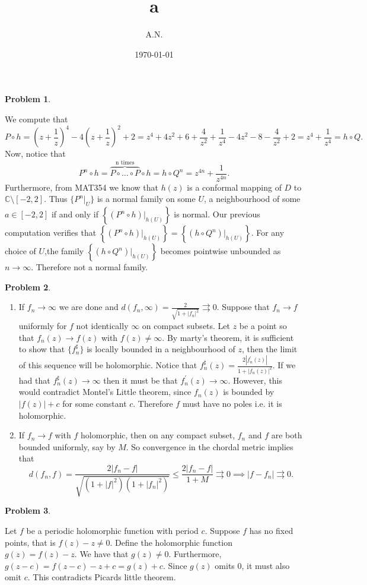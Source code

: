 \documentclass[12pt, a4paper]{article}
\title{a}
\author{A.N.}
\date{\today}
\newtheorem{problem}{Problem}
\theoremstyle{definition}
\newcommand{\penum}{ \begin{enumerate}[label=\bf(\alph*), leftmargin=0pt]}
\newcommand{\epenum}{ \end{enumerate} }
\newcommand{\C}{\mathbb{C}}                           %
\begin{document}
	\begin{problem}
	\end{problem}
We compute that $$P \circ h = \left(z+\frac{1}{z} \right)^4 - 4\left(z+\frac{1}{z}\right)^2 + 2 =z^4+4z^2+6+\frac{4}{z^2}+ \frac{1}{z^4}-4z^2-8 - \frac{4}{z^2}+2 = z^4+\frac{1}{z^4} = h\circ Q. $$ Now, notice that $$P^n \circ h = \overbrace{P \circ \dots \circ P}^{\text{n times}} \circ h = h \circ Q^n = z^{4n} + \frac{1}{z^{4n}}. $$
Furthermore, from MAT354 we know that $h(z)$ is a conformal mapping of $D$ to $\C \setminus{[-2,2]}$. Thus $\{P^n|_U\}$ is a normal family on some $U$, a neighbourhood of some $a\in [-2,2]$ if and only if $ \left\{(P^n\circ h)|_{h(U)} \right\}$ is normal. Our previous computation verifies that $\left\{(P^n\circ h)|_{h(U)} \right\} =  \left\{(h\circ Q^n)|_{h(U)} \right\}$. For any choice of $U$,the family  $ \left\{(h\circ Q^n)|_{h(U)} \right\}$ becomes pointwise unbounded as $n\to \infty$. Therefore not a normal family. 
\newpage
\begin{problem}
\end{problem}
\penum
\item If $f_n\to \infty$ we are done and $d(f_n,\infty) = \frac{2}{\sqrt{1+ |f_n|^2}} \rightrightarrows 0 $. Suppose that $f_n\to f$ uniformly for $f$ not identically $\infty$ on compact subsets. Let $z$ be a point so that $f_n(z)\to f(z)$ with $f(z)\neq \infty$. By marty's theorem, it is sufficient to show that $\{f_n^\sharp\}$ is locally bounded in a neighbourhood of $z$, then the limit of this sequence will be holomorphic. Notice that $f_n^\sharp(z) = \frac{2|f_n^\prime(z)|}{1+ |f_n(z)|^2}$. If we had that $f_n^\sharp(z)\to \infty$ then it must be that $f_n^\prime(z)\to \infty$. However, this would contradict Montel's Little theorem, since $f_n(z)$ is bounded by $|f(z)|+c$ for some constant $c$. Therefore $f$ must have no poles i.e. it is holomorphic. 
\item If $f_n \to f$ with $f$ holomorphic, then on any compact subset, $f_n$ and $f$ are both bounded uniformly, say by $M$. So convergence in the chordal metric implies that $$d(f_n,f) = \frac{2|f_n-f|}{\sqrt{(1+|f|^2)(1+|f_n|^2)} } \leq \frac{2|f_n-f|}{1+M} \rightrightarrows 0 \implies |f-f_n| \rightrightarrows 0. $$ 
\epenum
\newpage 
\begin{problem}
\end{problem}
Let $f$ be a periodic holomorphic function with period $c$. Suppose $f$ has no fixed points, that is $f(z)-z \neq 0$. Define the holomorphic function $g(z) = f(z) -z$. We have that $g(z)\neq 0$. Furthermore, $g(z-c) = f(z-c)- z+c = g(z)+c. $ Since $g(z)$ omits $0$, it must also omit $c$. This contradicts Picards little theorem. 
\end{document}

